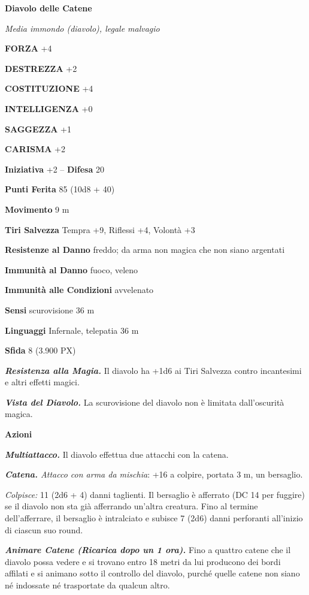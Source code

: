 \begin{multicols}{2}
\medskip{}\textbf{Diavolo delle Catene}

\textit{Media immondo (diavolo), legale malvagio}

\textbf{FORZA} +4

\textbf{DESTREZZA} +2

\textbf{COSTITUZIONE} +4

\textbf{INTELLIGENZA} +0

\textbf{SAGGEZZA} +1

\textbf{CARISMA} +2

\textbf{Iniziativa} +2 -- \textbf{Difesa} 20

\textbf{Punti Ferita} 85 (10d8 + 40)

\textbf{Movimento} 9 m

\textbf{Tiri Salvezza} Tempra +9, Riflessi +4, Volontà +3

\textbf{Resistenze al Danno} freddo; da arma non magica che non siano argentati

\textbf{Immunità al Danno} fuoco, veleno

\textbf{Immunità alle Condizioni} avvelenato

\textbf{Sensi} scurovisione 36 m

\textbf{Linguaggi} Infernale, telepatia 36 m

\textbf{Sfida} 8 (3.900 PX)

\textit{\textbf{Resistenza alla Magia.}} Il diavolo ha +1d6 ai Tiri Salvezza contro incantesimi e altri effetti magici.

\textit{\textbf{Vista del Diavolo.}} La scurovisione del diavolo non è limitata dall'oscurità magica.

\textbf{Azioni}

\textit{\textbf{Multiattacco.}} Il diavolo effettua due attacchi con la catena.

\textit{\textbf{Catena.} Attacco con arma da mischia}: +16 a colpire, portata 3 m, un bersaglio.

\textit{Colpisce:} 11 (2d6 + 4) danni taglienti. Il bersaglio è afferrato (DC 14 per fuggire) se il diavolo non sta già afferrando un'altra creatura. Fino al termine dell'afferrare, il bersaglio è intralciato e subisce 7 (2d6) danni perforanti all'inizio di ciascun suo round.

\textit{\textbf{Animare Catene (Ricarica dopo un 1 ora).}} Fino a quattro catene che il diavolo possa vedere e si trovano entro 18 metri da lui producono dei bordi affilati e si animano sotto il controllo del diavolo, purché quelle catene non siano né indossate né trasportate da qualcun altro.


\end{multicols}
